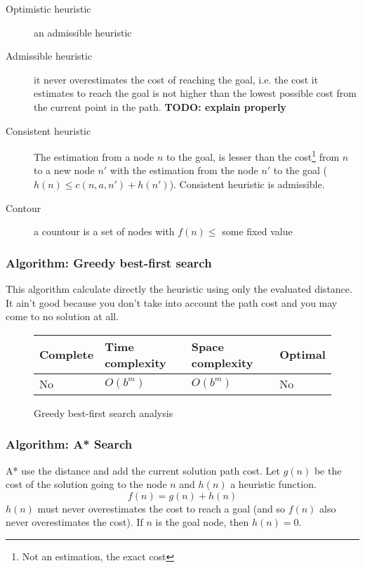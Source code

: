 \begin{description}
\item[Optimistic heuristic] an admissible heuristic
\item[Admissible heuristic] it never overestimates the cost of reaching the goal, i.e. the cost it estimates to reach the goal is not higher than the lowest possible cost from the current point in the path.\cite{wikiadmheur} \textbf{TODO: explain properly}
\item[Consistent heuristic] The estimation from a node $n$ to the goal, is lesser than the cost\footnote{Not an estimation, the exact cost} from $n$ to a new node $n'$ with the estimation from the node $n'$ to the goal ($h(n) \leq c(n,a,n')+h(n')$).
    Consistent heuristic is admissible.
\item[Contour] a countour is a set of nodes with $f(n) \leq$ some fixed value
\end{description}

\subsubsection{Algorithm: Greedy best-first search}

This algorithm calculate directly the heuristic using only the evaluated distance. It ain't good because you don't take into account the path cost and you may come to no solution at all. 

\begin{figure}[h]
\centering
\begin{tabular}{|llll|}
\hline
\textbf{Complete} & \textbf{Time complexity} & \textbf{Space complexity} & \textbf{Optimal} \\
\hline
No& $O(b^m)$ & $O(b^m)$ & No\\
\hline
\end{tabular}
\caption{Greedy best-first search analysis}
\end{figure}

\subsubsection{Algorithm: A* Search}

A* use the distance and add the current solution path cost. Let $g(n)$ be the cost of the solution going to the node $n$ and $h(n)$ a heuristic function.
$$f(n) = g(n) + h(n)$$
$h(n)$ must never overestimates the cost to reach a goal (and so $f(n)$ also never overestimates the cost). If $n$ is the goal node, then $h(n) = 0$.

